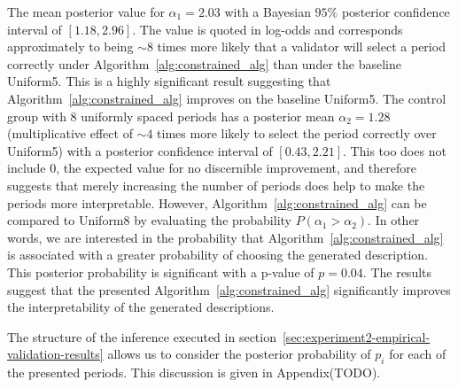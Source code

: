 The mean posterior value for $\alpha_1 = 2.03$ with a Bayesian $95\%$ posterior confidence interval of $[1.18, 2.96]$. The value is quoted in log-odds and corresponds approximately to being $\sim 8$ times more likely that a validator will select a period correctly under Algorithm~\ref{alg:constrained_alg} than under the baseline Uniform5. This is a highly significant result suggesting that Algorithm~\ref{alg:constrained_alg} improves on the baseline Uniform5. The control group with 8 uniformly spaced periods has a posterior mean $\alpha_2 = 1.28$ (multiplicative effect of $\sim 4$ times more likely to select the period correctly over Uniform5) with a posterior confidence interval of $[0.43, 2.21]$. This too does not include $0$, the expected value for no discernible improvement, and therefore suggests that merely increasing the number of periods does help to make the periods more interpretable. However, Algorithm~\ref{alg:constrained_alg} can be compared to Uniform8 by evaluating the probability $P(\alpha_1 > \alpha_2)$. In other words, we are interested in the probability that Algorithm~\ref{alg:constrained_alg} is associated with a greater probability of choosing the generated description. This posterior probability is significant with a p-value of $p = 0.04$. The results suggest that the presented Algorithm~\ref{alg:constrained_alg} significantly improves the interpretability of the generated descriptions.

The structure of the inference executed in section~\ref{sec:experiment2-empirical-validation-results} allows us to consider the posterior probability of $p_i$ for each of the presented periods. This discussion is given in Appendix(TODO).%
